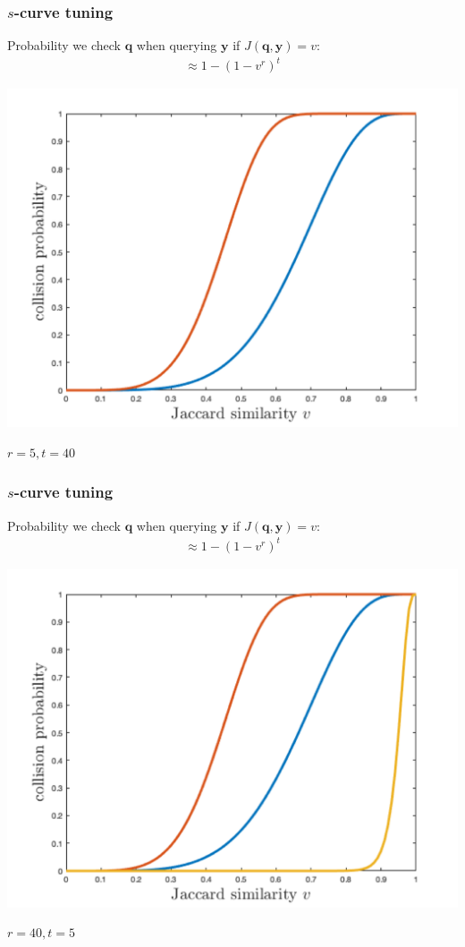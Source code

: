 \documentclass[compress]{beamer}
\newcommand{\bv}[1]{\mathbf{#1}}
\begin{document}
\begin{frame}
	\frametitle{$s$-curve tuning}
	Probability we check $\bv{q}$ when querying $\bv{y}$ if $J(\bv{q},\bv{y}) = v$:
	\begin{align*}
	\approx 1 - (1 - v^r)^t
	\end{align*}
	\begin{center}
		\includegraphics[width=.6\textwidth]{scurve_5_40.png}
		
		$r = 5, t = 40$
	\end{center}
\end{frame}

\begin{frame}
	\frametitle{$s$-curve tuning}
	Probability we check $\bv{q}$ when querying $\bv{y}$ if $J(\bv{q},\bv{y}) = v$:
	\begin{align*}
	\approx 1 - (1 - v^r)^t 
	\end{align*}
	\begin{center}
		\includegraphics[width=.6\textwidth]{scurve_40_5.png}
		
		$r = 40, t = 5$
	\end{center}
\end{frame}
\end{document}
